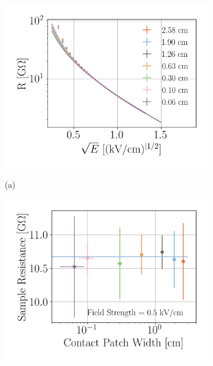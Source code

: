 \documentclass[a4paper,12pt]{article}
\begin{document}
\begin{figure}[htb]
\centering
\begin{subfigure}[c]{0.32\textheight}
	\begin{center}
		\includegraphics[width=\textwidth]{TLM_contact_resistance.png}
		
		\vspace*{-\baselineskip} \hspace{1em} (a)
	\end{center}
\end{subfigure}
\begin{subfigure}[c]{0.32\textheight}
	\begin{center}
		\includegraphics[width=\textwidth]{TLM_contact_fit.png}
		

\end{center}
\end{subfigure}
\end{figure}
\end{document}
